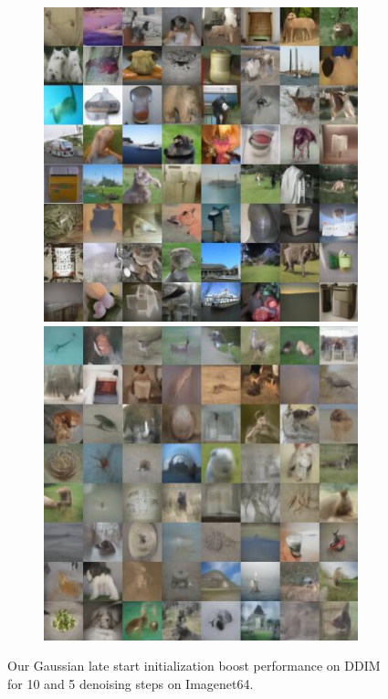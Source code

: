 \begin{figure}
\begin{subfigure}{0.495\textwidth}
  \end{subfigure}
  \begin{subfigure}{0.495\textwidth}
    \includegraphics[width=\linewidth]{figs/imgs/ddpm_ddim_imagenet64_data_samples_T_900.jpg}
    \includegraphics[width=\linewidth]{figs/imgs/ddpm_ddim_imagenet64_data_samples_T_800_5_steps.jpg}
  \end{subfigure}
  \caption{Our Gaussian late start initialization boost performance on DDIM for 10 and 5 denoising steps on Imagenet64.}
   \label{fig:glsddim_imagenet64}
\end{figure}

